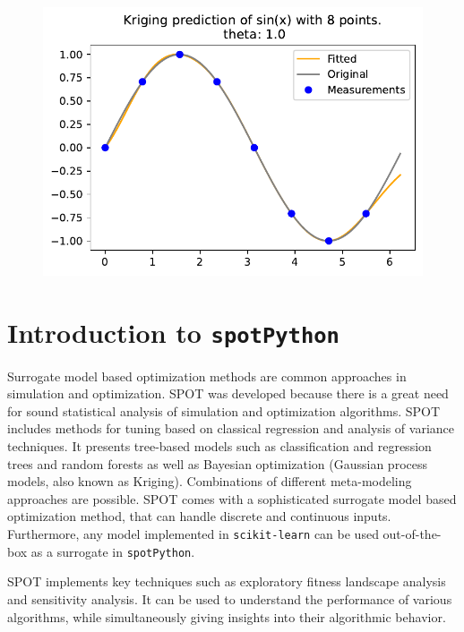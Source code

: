 \documentclass[
  letterpaper,
  DIV=11,
  numbers=noendperiod]{scrreprt}
\begin{document}
\begin{figure}[H]

{\centering \includegraphics{006_num_gp_files/figure-pdf/cell-46-output-1.pdf}

}

\end{figure}

\hypertarget{sec-spot}{%
\chapter{\texorpdfstring{Introduction to
\texttt{spotPython}}{Introduction to spotPython}}\label{sec-spot}}

Surrogate model based optimization methods are common approaches in
simulation and optimization. SPOT was developed because there is a great
need for sound statistical analysis of simulation and optimization
algorithms. SPOT includes methods for tuning based on classical
regression and analysis of variance techniques. It presents tree-based
models such as classification and regression trees and random forests as
well as Bayesian optimization (Gaussian process models, also known as
Kriging). Combinations of different meta-modeling approaches are
possible. SPOT comes with a sophisticated surrogate model based
optimization method, that can handle discrete and continuous inputs.
Furthermore, any model implemented in \texttt{scikit-learn} can be used
out-of-the-box as a surrogate in \texttt{spotPython}.

SPOT implements key techniques such as exploratory fitness landscape
analysis and sensitivity analysis. It can be used to understand the
performance of various algorithms, while simultaneously giving insights
into their algorithmic behavior.
\end{document}
